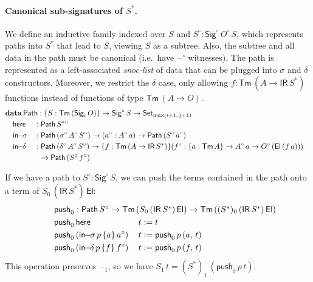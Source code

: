 \documentclass[acmsmall,screen,review,anonymous]{acmart}
\newcommand{\msf}[1]{{\mathsf{#1}}}
\newcommand{\mbf}[1]{{\mathbf{#1}}}
\newcommand{\push}{\mathsf{push}}
\newcommand{\data}{\mbf{data}}
\newcommand{\Set}{\msf{Set}}
\newcommand{\El}{\msf{El}}
\newcommand{\Sig}{\msf{Sig}}
\newcommand{\blank}{{\mathord{\hspace{1pt}\text{--}\hspace{1pt}}}}
\newcommand{\IR}{\msf{IR}}
\newcommand{\Tm}{\msf{Tm}}
\newcommand{\w}{\circ}
\newcommand{\Path}{\msf{Path}}
\newcommand{\here}{\msf{here}}
\newcommand{\Ssw}{S^{*\w}}
\newcommand{\insigma}{\msf{in}\!\!-\!\!\sigma}
\newcommand{\indelta}{\msf{in}\!\!-\!\!\delta}
\begin{document}
\paragraph{Canonical sub-signatures of $S^*$.} We define an inductive family indexed
over $S$ and $S^\w : \Sig^\w\,O^\w\,S$, which represents paths into $S^*$ that lead to $S$, viewing
$S$ as a subtree. Also, the subtree and all data in the path must be canonical (i.e.\ have $\blank^\w$
witnesses). The path is represented as a left-associated \emph{snoc-list} of data that can be
plugged into $\sigma$ and $\delta$ constructors. Moreover, we restrict the $\delta$ case, only
allowing $f : \Tm\,(A \to \IR\,S^*)$ functions instead of functions of type $\Tm\,(A \to O)$.
\begin{alignat*}{4}
  &\rlap{$\data\,\Path : \{S : \Tm\,(\Sig_i\,O)\} \to \Sig^\w\,S \to \Set_{\max(i+1,\,j+1)}$}\\
  &\quad \here    &&: \Path\,\Ssw\\
  &\quad \insigma &&: \Path\,(\sigma^\w\,A^\w\,S^\w) \to (a^\w : A^\w\,a) \to \Path\,(S^\w\,a^\w) \\
  &\quad \indelta &&: \Path\,(\delta^\w\,A^\w\,S^\w) \to \{f : \Tm\,(A \to \IR\,S^*)\}(f^\w : \{a : \Tm\,A\} \to A^\w\,a \to O^\w\,(\El\,(f\,a)))\\
  &               && \hspace{0.6em} \to \Path\,(S^\w\,f^\w)
\end{alignat*}

If we have a path to $S^\w : \Sig^\w\,S$, we can push the terms contained in the path onto a
term of $S_0\,(\IR\,S^*)\,\El$:
\begin{alignat*}{4}
  & \hspace{-6em}\rlap{$\push_0 : \Path\,S^\w \to \Tm\,(S_0\,(\IR\,S^*)\,\El) \to \Tm\,((S^*)_0\,(\IR\,S^*)\,\El)$}\\
  & \hspace{-6em}\push_0\,\here\,                     &&t := t\\
  & \hspace{-6em}\push_0\,(\insigma\,p\,\{a\}\,a^\w)\,&&t := \push_0\,p\,(a,\,t)\\
  & \hspace{-6em}\push_0\,(\indelta\,p\,\{f\}\,f^\w)\,&&t := \push_0\,p\,(f,\,t)
\end{alignat*}
This operation preserves $\blank_1$, so we have $S_1\,t = (S^*)_1\,(\push_0\,p\,t)$.
\end{document}
